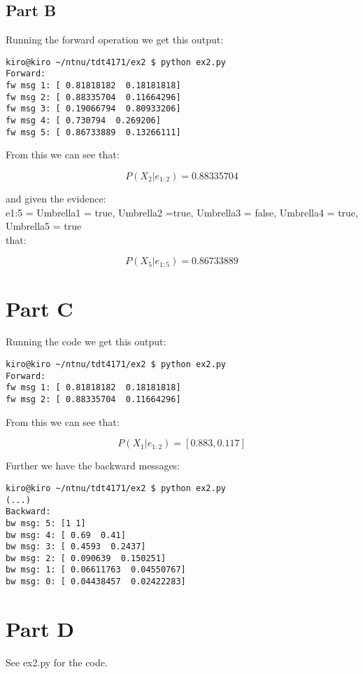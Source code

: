 \documentclass[12pt, a4paper]{article}
\begin{document}
\subsection{Part B}

Running the forward operation we get this output:

\begin{verbatim}
kiro@kiro ~/ntnu/tdt4171/ex2 $ python ex2.py 
Forward:
fw msg 1: [ 0.81818182  0.18181818]
fw msg 2: [ 0.88335704  0.11664296]
fw msg 3: [ 0.19066794  0.80933206]
fw msg 4: [ 0.730794  0.269206]
fw msg 5: [ 0.86733889  0.13266111]
\end{verbatim}

From this we can see that:

\begin{equation}
P(X_2|e_{1:2}) = 0.88335704
\end{equation}

and given the evidence: \\
{ e1:5 = Umbrella1 = true, Umbrella2 =true, Umbrella3 = false, Umbrella4 = true, Umbrella5 = true } \\
that: 

\begin{equation}
P(X_5|e_{1:5}) = 0.86733889
\end{equation}

\section{Part C}
Running the code we get this output: 

\begin{verbatim}
kiro@kiro ~/ntnu/tdt4171/ex2 $ python ex2.py 
Forward:
fw msg 1: [ 0.81818182  0.18181818]
fw msg 2: [ 0.88335704  0.11664296]
\end{verbatim}

From this we can see that: 

\begin{equation}
P(X_1|e_{1:2}) = [ 0.883,0.117 ]
\end{equation}

Further we have the backward messages:  

\begin{verbatim}
kiro@kiro ~/ntnu/tdt4171/ex2 $ python ex2.py 
(...)
Backward:
bw msg: 5: [1 1]
bw msg: 4: [ 0.69  0.41]
bw msg: 3: [ 0.4593  0.2437]
bw msg: 2: [ 0.090639  0.150251]
bw msg: 1: [ 0.06611763  0.04550767]
bw msg: 0: [ 0.04438457  0.02422283]
\end{verbatim}

\section{Part D}
See ex2.py for the code. 
\end{document}
